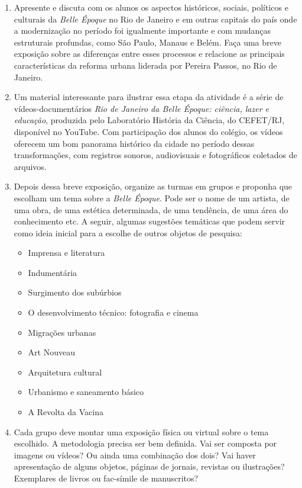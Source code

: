 \documentclass[12pt]{extarticle}
\begin{document}


\begin{enumerate}

\item
Apresente e discuta com os alunos os aspectos
históricos, sociais, políticos e culturais da \emph{Belle Époque} no Rio
de Janeiro e em outras capitais do país onde a modernização no período
foi igualmente importante e com mudanças estruturais profundas, como São
Paulo, Manaus e Belém. Faça uma breve exposição sobre as diferenças
entre esses processos e relacione as principais características da
reforma urbana liderada por Pereira Passos, no Rio de Janeiro.

\item
Um material interessante para ilustrar essa etapa da atividade é a
série de vídeos-documentários \emph{Rio de Janeiro da Belle Époque:
ciência, lazer e educação}, produzida pelo Laboratório História da
Ciência, do CEFET/RJ, disponível no YouTube. Com participação dos
alunos do colégio, os vídeos oferecem um bom panorama histórico da
cidade no período dessas transformações, com registros sonoros,
audiovisuais e fotográficos coletados de arquivos.

\item
Depois dessa breve exposição, organize as turmas em grupos e proponha
que escolham um tema sobre a \emph{Belle Époque}. Pode ser o nome de um
artista, de uma obra, de uma estética determinada, de uma tendência, de
uma área do conhecimento etc. A seguir, algumas sugestões temáticas que
podem servir como ideia inicial para a escolhe de outros
objetos de pesquisa:

\begin{itemize}
\item
  Imprensa e literatura
\item
  Indumentária
\item
  Surgimento dos subúrbios
\item
  O desenvolvimento técnico: fotografia e cinema
\item
  Migrações urbanas
\item
  Art Nouveau
\item
  Arquitetura cultural
\item
  Urbanismo e saneamento básico
\item
  A Revolta da Vacina
\end{itemize}

\item
Cada grupo deve montar uma exposição física ou virtual sobre o tema
escolhido. A metodologia precisa ser bem definida. Vai ser composta por
imagens ou vídeos? Ou ainda uma combinação dos dois? Vai haver
apresentação de alguns objetos, páginas de jornais, revistas ou
ilustrações? Exemplares de livros ou fac-símile de manuscritos?


\end{enumerate}
\end{document}
